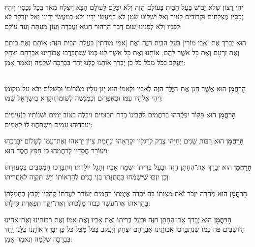 \documentclass[a4paper, twoside, openany, parskip=half, 10pt]{article}
\begin{document}
\begin{multicols}{2}
\begin{footnotesize}
\\
יְהִי רָצוֹן שֶׁלֹא יֵבוֹשׁ בַּעַל הַבַּיִת בָּעוֹלָם הַזֶּה וְלֹא יִכָּלֵם לָעוֹלָם הַבָּא וְיִצְלַח מְאֹד בְּכָל נְכָסָיו וְיִהְיוּ נְכָסָיו מֻצְלָחִים וּקְרוֹבִים לָעִיר וְאַל יִשְׁלוֹט שָׂטָן לֹא בְּמַעֲשֵׂי יָדָיו וְלֹא בְּמַעֲשֵׂי יָדֵינוּ וְאַל יִזְדַקֵּר לֹא לְפָנָיו וְלֹא לְפָנֵינוּ שׁוּם דְבַר הִרְהוּר חֵטְא וַעֲבֵרָה וְעָוֹן מֵעַתָּה וְעַד עוֹלָם:

\end{footnotesize}
 
 הוּא יְבָרֵךְ אֶת [אָבִי מוֹרִי] בַּעַל הַבַּֽיִת הַזֶּה וְאֶת [אִמִּי מוֹרָתִי] בַּעֲלַת הַבַּֽיִת הַזֶּה: אוֹתָם וְאֶת בֵּיתָם וְאֶת זַרְעָם וְאֶת כָּל אַשֶׁר לָהֶם, אוֹתָנוּ וְאֶת כָּל אַשֶׁר לָֽנוּ כְּמוֹ שֶׁנִּתְבָּרֲכוּ אֲבוֹתֵֽינוּ אַבְרָהָם יִצְחָק וְיַעֲקֹב בַּכֹּל מִכֹּל כֹּל כֵּן יְבָרֵךְ אוֹתָֽנוּ כֻּלָּנוּ יַֽחַד בִּבְרָכָה שְׁלֵמָה וְנֹאמַר אָמֵן:

\begin{sometimes}

\\
	\textbf{הָרַחֲמָן}
	 הוּא אֲשֶׁר חָנַן אֶת־הַיֶּלֶד הַזֶּה לְאָבִיו וּלְאִמּוֹ הוּא יָגֵן עָלָיו מִמְּֿרוֹמוֹ וּבְשָׁלוֹם יָבֹא עַל־מְקוֹמוֹ וִיהִי אֱלֹהָיו עִמּוֹ וּכְאֶפְרַיִם וְכִמְנַשֶּׁה לְשׂוּמוֹ ְויִקָּרֵא בְיִשְׂרָאֵל שְׁמוֹ:
	 
	\textbf{הָרַחֲמָן}
	 הוּא פָּקוֹד יִפְקְֿדֵהוּ בְּרַחֲמִים לַהֲבִינוֹ בְּדָת חִכּוּמִים וִיבַלֶּה בַטּוֹב יָמִים וּשְׁנוֹתָיו בַּנְּֿעִימִים יַעַבְדוּהוּ עַמִּים וְיִשְׁתַּחֲווּ לוֹ לְאֻמִּים: 
	
	\textbf{הָרַחֲמָן}
	 הוּא רַבּוֹת שָׁנִים יְחַיֵּהוּ צֶדֶק לְרַגְלָיו יִקְרָאֵהוּ וְנֶחָמַת צִיּוֹן יַרְאֵהוּ וְאֶת־עַמּוֹ לְשָׁלוֹם יְבָרֲכֵהוּ וִיעוֹרֵר חֲסָדָיו לְרַחֲמֵהוּ כִּי חָפֵץ חֶסֶד הוּא: 
	
	\textbf{הָרַחֲמָן}
	 הוּא יְבָרֵךְ אֶת־הֶחָתָן הַזֶּה וּבַעַל בְּרִיתוֹ יִשְׂמַח אָבִיו וְתָגֵל יוֹלַדְתּוֹ וְיִתְבָּרַכוּ הַמְֿסֻבִּים בִּסְעוּדָתוֹ וְכֵן יִזְכּוּ שֶׁיִּשְׂמְֿחוּ בַּחֲתֻנָּתוֹ בְּנֵי בָנִים לְהַרְאוֹתוֹ וְיֵשׁ תִּקְוָה לְאַחֲרִיתוֹ: 
	
	\textbf{הָרַחֲמָן}
	 הוּא מְהֵרָה יִזְכֹּר זֹאת מִצְוָתוֹ בָּהּ יִפְדֶה אֲיֻמָּתוֹ רַחֲמִים יְעוֹרֵר לַעֲדָתוֹ קְהָלָיו יְקַבֵּץ בְּחֶמְלָתוֹ בְּהַרְאֹתוֹ אֶת־עֹשֶׁר כְּבוֹד מַלְכוּתוֹ וְאֶת־יְקָר תִּפְאֶרֶת גְּדֻלָּתוֹ: 
	
	\textbf{הָרַחֲמָן}
	 הוּא יְבָרֵךְ אֶת־הֶחָתָן הַזֶּה וּבַּעַל בְּרִיתוֹ וְאֶת אָבִיו וְאֶת אִמּוֹ וְאֶת רַבּוֹתֵינוּ וְאֶת־אַחֵינוּ הַיּוֹשְֿׁבִים פֹּה כְּמוֹ שֶׁנִתְבָּרֲכוּ אֲבוֹתֵֽינוּ אַבְרָהָם יִצְחָק וְיַעֲקֹב בַּכֹּל מִכֹּל כֹּל כֵּן יְבָרֵךְ אוֹתָֽנוּ כֻּלָּנוּ יַֽחַד בִּבְרָכָה שְׁלֵמָה וְנֹאמַר אָמֵן:\\


\end{sometimes}
\end{multicols}
\end{document}
